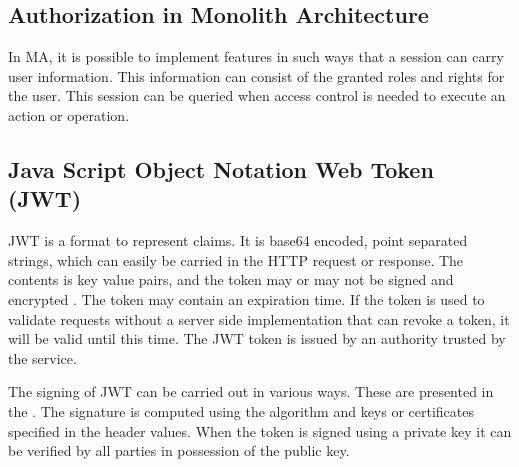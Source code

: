 \subsection{Authorization in Monolith Architecture}
\begin{sloppypar}
    In MA, it is possible to implement features in such ways that a session can 
    carry user information. This information can consist of the granted roles 
    and rights for the user. This session can be queried when access control is 
    needed to execute an action or operation.
\end{sloppypar}

\subsection{Java Script Object Notation Web Token (JWT)}
\begin{sloppypar}
    JWT is a format to represent claims. It is base64 encoded, point separated 
    strings, which can easily be carried in the HTTP request or response. The 
    contents is key value pairs, and the token may or may not be signed and 
    encrypted \citep{RFC7519}. The token may contain an expiration time. If the 
    token is used to validate requests without a server side implementation 
    that can revoke a token, it will be valid until this time. The JWT token is 
    issued by an authority trusted by the service.
\end{sloppypar}
\begin{sloppypar}
    The signing of JWT can be carried out in various ways. These are presented 
    in the \citet{RFC7515}. The signature is computed using the algorithm and 
    keys or certificates specified in the header values. When the token is 
    signed using a private key it can be verified by all parties in 
    possession of the public key. 
\end{sloppypar}


